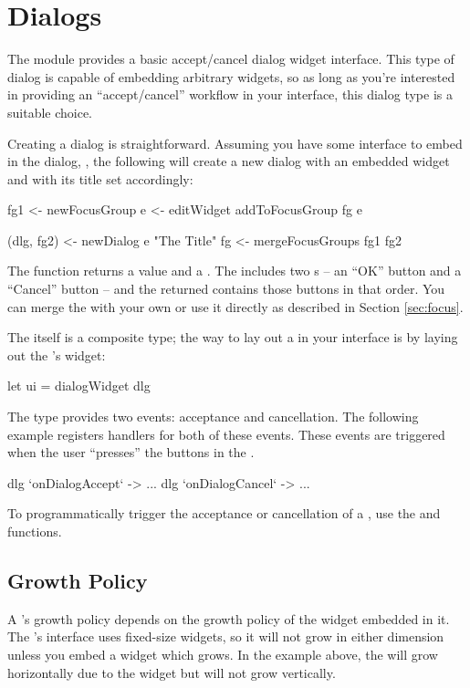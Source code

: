 \section{Dialogs}
\label{sec:dialogs}

The  module provides a basic accept/cancel dialog widget
interface.  This type of dialog is capable of embedding arbitrary
widgets, so as long as you're interested in providing an
``accept/cancel'' workflow in your interface, this dialog type is a
suitable choice.

Creating a dialog is straightforward.  Assuming you have some
interface to embed in the dialog, , the following will create a
new dialog with an embedded  widget and with its title set
accordingly:

\begin{haskellcode}
 fg1 <- newFocusGroup
 e <- editWidget
 addToFocusGroup fg e

 (dlg, fg2) <- newDialog e "The Title"
 fg <- mergeFocusGroups fg1 fg2
\end{haskellcode}

The  function returns a  value and a
.  The  includes two s -- an
``OK'' button and a ``Cancel'' button -- and the returned
 contains those buttons in that order.  You can merge
the  with your own or use it directly as described in
Section \ref{sec:focus}.

The  itself is a composite type; the way to lay out a
 in your interface is by laying out the 's
widget:

\begin{haskellcode}
 let ui = dialogWidget dlg
\end{haskellcode}

The  type provides two events: acceptance and cancellation.
The following example registers handlers for both of these events.
These events are triggered when the user ``presses'' the buttons in
the .

\begin{haskellcode}
 dlg `onDialogAccept` \this ->
   ...
 dlg `onDialogCancel` \this ->
   ...
\end{haskellcode}

To programmatically trigger the acceptance or cancellation of a
, use the  and 
functions.

\subsection{Growth Policy}

A 's growth policy depends on the growth policy of the
widget embedded in it.  The 's interface uses fixed-size
widgets, so it will not grow in either dimension unless you embed a
widget which grows.  In the example above, the  will grow
horizontally due to the  widget but will not grow vertically.

